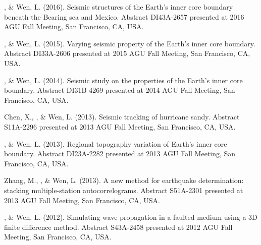 \begin{etaremune}
    \Tian, \& Wen, L. (2016).
    Seismic structures of the Earth's inner core boundary beneath the Bearing sea and Mexico.
    Abstract DI43A-2657 presented at 2016 AGU Fall Meeting, San Francisco, CA, USA.
\item
    \Tian, \& Wen, L. (2015).
    Varying seismic property of the Earth's inner core boundary.
    Abstract DI33A-2606 presented at 2015 AGU Fall Meeting, San Francisco, CA, USA.
\item
    \Tian, \& Wen, L. (2014).
    Seismic study on the properties of the Earth's inner core boundary.
    Abstract DI31B-4269 presented at 2014 AGU Fall Meeting, San Francisco, CA, USA.
\item
    Chen, X., \Tian, \& Wen, L. (2013).
    Seismic tracking of hurricane sandy.
    Abstract S11A-2296 presented at 2013 AGU Fall Meeting, San Francisco, CA, USA.
\item
    \Tian, \& Wen, L. (2013).
    Regional topography variation of Earth's inner core boundary.
    Abstract DI23A-2282 presented at 2013 AGU Fall Meeting, San Francisco, CA, USA.
\item
    Zhang, M., \Tian, \& Wen, L. (2013).
    A new method for earthquake determination: stacking multiple-station autocorrelograms.
    Abstract S51A-2301 presented at 2013 AGU Fall Meeting, San Francisco, CA, USA.
\item
    \Tian, \& Wen, L. (2012).
    Simulating wave propagation in a faulted medium using a 3D finite difference method.
    Abstract S43A-2458 presented at 2012 AGU Fall Meeting, San Francisco, CA, USA.
\end{etaremune}

